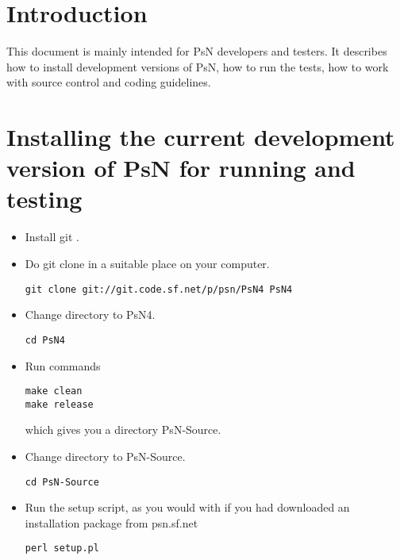 
\usepackage{hyperref}



\maketitle

  
\section{Introduction}

This document is mainly intended for PsN developers and testers. It describes how to install development versions of PsN, how to run the tests, how to work with source control and coding guidelines.

\section{Installing the current development version of PsN for running and testing}
\begin{itemize}
\item Install git \cite{git}. 
\item Do git clone in a suitable place on your computer.
\begin{verbatim}
git clone git://git.code.sf.net/p/psn/PsN4 PsN4
\end{verbatim}
\item Change directory to PsN4.
\begin{verbatim}
cd PsN4
\end{verbatim}
\item Run commands 
\begin{verbatim}
make clean
make release
\end{verbatim}
\noindent which gives you a directory PsN-Source.
\item Change directory to PsN-Source.
\begin{verbatim}
cd PsN-Source
\end{verbatim}
\item Run the setup script, as you would with if you had downloaded an installation package from psn.sf.net
\begin{verbatim}
perl setup.pl
\end{verbatim}
\end{itemize}

